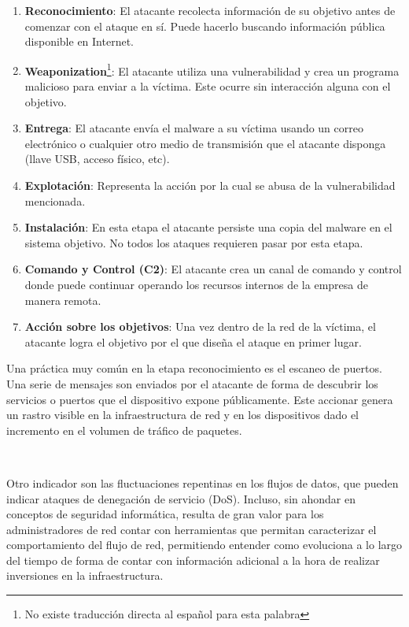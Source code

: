 \documentclass[a4paper,12pt, oneside]{article}
\begin{document}
\begin{enumerate}
\item \textbf{Reconocimiento}: El atacante recolecta información de su objetivo antes de comenzar con el ataque en sí. Puede hacerlo buscando información pública disponible en Internet.
\item \textbf{Weaponization}\footnote{No existe traducción directa al español para esta palabra}: El atacante utiliza una vulnerabilidad y crea un programa malicioso para enviar a la víctima. Este ocurre sin interacción alguna con el objetivo.
\item \textbf{Entrega}: El atacante envía el malware a su víctima usando un correo electrónico o cualquier otro medio de transmisión que el atacante disponga (llave USB, acceso físico, etc).
\item \textbf{Explotación}: Representa la acción por la cual se abusa de la vulnerabilidad mencionada.
\item \textbf{Instalación}: En esta etapa el atacante persiste una copia del malware en el sistema objetivo. No todos los ataques requieren pasar por esta etapa.
\item \textbf{Comando y Control (C2)}: El atacante crea un canal de comando y control donde puede continuar operando los recursos internos de la empresa de manera remota.
\item \textbf{Acción sobre los objetivos}: Una vez dentro de la red de la víctima, el atacante logra el objetivo por el que diseña el ataque en primer lugar.
\end{enumerate}


Una práctica muy común en la etapa reconocimiento es el escaneo de puertos. Una serie de mensajes son enviados por el atacante de forma de descubrir los servicios o puertos que el dispositivo expone públicamente. Este accionar genera un rastro visible en la infraestructura de red y en los dispositivos dado el incremento en el volumen de tráfico de paquetes. 

\

Otro indicador son las fluctuaciones repentinas en los flujos de datos, que pueden indicar ataques de denegación de servicio (DoS). Incluso, sin ahondar en conceptos de seguridad informática, resulta de gran valor para los administradores de red contar con herramientas que permitan caracterizar el comportamiento del flujo de red, permitiendo entender como evoluciona a lo largo del tiempo de forma de contar con información adicional a la hora de realizar inversiones en la infraestructura.
\end{document}
